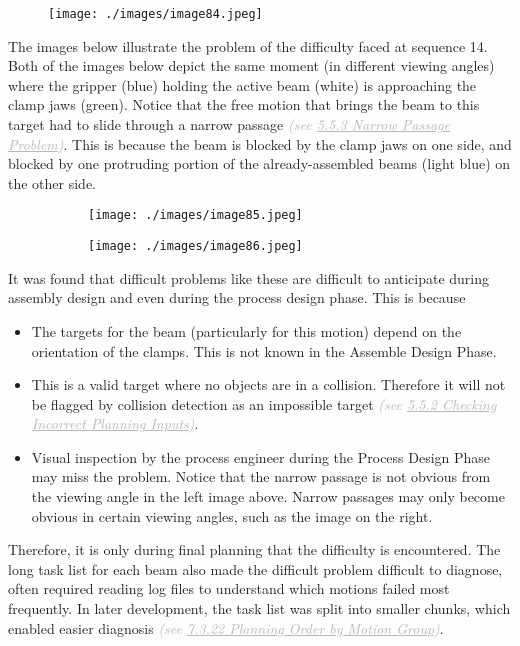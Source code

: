 \begin{figure}[H]
\texttt{[image: ./images/image84.jpeg]}
\end{figure}


The images below illustrate the problem of the difficulty faced at sequence 14. Both of the images below depict the same moment (in different viewing angles) where the gripper (blue) holding the active beam (white) is approaching the clamp jaws (green). Notice that the free motion that brings the beam to this target had to slide through a narrow passage \textit{\textcolor[HTML]{B7B7B7}{(see \uline{5.5.3 Narrow Passage Problem})}}. This is because the beam is blocked by the clamp jaws on one side, and blocked by one protruding portion of the already-assembled beams (light blue) on the other side.

\begin{figure}[H]
\centering
\begin{subfigure}[b]{0.45\textwidth}
\centering
\texttt{[image: ./images/image85.jpeg]}
\end{subfigure}
\hfill
\begin{subfigure}[b]{0.45\textwidth}
\centering
\texttt{[image: ./images/image86.jpeg]}
\end{subfigure}
\end{figure}


It was found that difficult problems like these are difficult to anticipate during assembly design and even during the process design phase. This is because 

\begin{itemize}
	\item The targets for the beam (particularly for this motion) depend on the orientation of the clamps. This is not known in the Assemble Design Phase.

	\item This is a valid target where no objects are in a collision. Therefore it will not be flagged by collision detection as an impossible target \textit{\textcolor[HTML]{B7B7B7}{(see \uline{5.5.2 Checking Incorrect Planning Inputs})}}.

	\item Visual inspection by the process engineer during the Process Design Phase may miss the problem. Notice that the narrow passage is not obvious from the viewing angle in the left image above. Narrow passages may only become obvious in certain viewing angles, such as the image on the right.

\end{itemize}
Therefore, it is only during final planning that the difficulty is encountered. The long task list for each beam also made the difficult problem difficult to diagnose, often required reading log files to understand which motions failed most frequently. In later development, the task list was split into smaller chunks, which enabled easier diagnosis \textit{\textcolor[HTML]{B7B7B7}{(see \uline{7.3.22 Planning Order by Motion Group})}}. 

